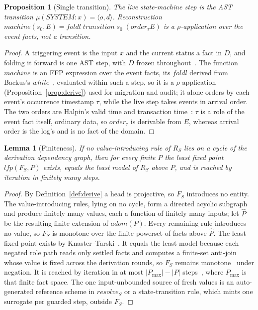 \documentclass[10pt,twocolumn]{article}
\theoremstyle{plain}
\newtheorem{lemma}{Lemma}
\newtheorem{proposition}{Proposition}
\theoremstyle{definition}
\begin{document}
\begin{proposition}[Single transition]\label{prop:onestep}
The live state-machine step is the AST transition $\mu(\mathit{SYSTEM}\!:\!x)=\langle o,d\rangle$. Reconstruction $\mathit{machine}(s_0,E)=\mathit{foldl}\;\mathit{transition}\;s_0\;(\mathit{order}_\tau E)$ is a $\rho$-application over the event facts, not a transition.
\end{proposition}
\begin{proof}
A triggering event is the input $x$ and the current status a fact in $D$, and folding it forward is one AST step, with $D$ frozen throughout~\cite[Secs.\,14.3.1,\,14.6]{backus78}. The function $\mathit{machine}$ is an FFP expression over the event facts, its $\mathit{foldl}$ derived from Backus's $\mathit{while}$~\cite[Sec.\,11.2.4]{backus78}, evaluated within such a step, so it is a $\rho$-application (Proposition~\ref{prop:derive}) used for migration and audit; it alone orders by each event's occurrence timestamp $\tau$, while the live step takes events in arrival order. The two orders are Halpin's valid time and transaction time~\cite[Sec.\,13.6]{halpin08}: $\tau$ is a role of the event fact itself, ordinary data, so $\mathit{order}_\tau$ is derivable from $E$, whereas arrival order is the log's and is no fact of the domain.
\end{proof}

\begin{lemma}[Finiteness]\label{lem:finite}
If no value-introducing rule of $R_S$ lies on a cycle of the derivation dependency graph, then for every finite $P$ the least fixed point $\mathit{lfp}(F_S,P)$ exists, equals the least model of $R_S$ above $P$, and is reached by iteration in finitely many steps.
\end{lemma}
\begin{proof}
By Definition~\ref{def:derive} a head is projective, so $F_S$ introduces no entity. The value-introducing rules, lying on no cycle, form a directed acyclic subgraph and produce finitely many values, each a function of finitely many inputs; let $\hat{P}$ be the resulting finite extension of $\mathit{adom}(P)$. Every remaining rule introduces no value, so $F_S$ is monotone over the finite powerset of facts above $\hat{P}$. The least fixed point exists by Knaster--Tarski~\cite{tarski55}. It equals the least model because each negated role path reads only settled facts and computes a finite-set anti-join whose value is fixed across the derivation rounds, so $F_S$ remains monotone~\cite{vanemden76} under negation. It is reached by iteration in at most $|P_{\max}|-|P|$ steps~\cite{kleene52}, where $P_{\max}$ is that finite fact space. The one input-unbounded source of fresh values is an auto-generated reference scheme in $\mathit{resolve}_S$ or a state-transition rule, which mints one surrogate per guarded step, outside $F_S$.
\end{proof}
\end{document}
